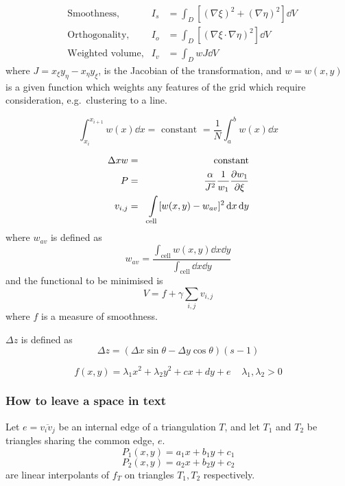 \begin{align}
  &\text{Smoothness,} & 
  I_s &= \int_{D}  [(\nabla \xi)^{2} + (\nabla \eta)^{2} ] \dd V   \\
  &\text{Orthogonality,} &
  I_o &= \int_{D}  [(\nabla \xi \cdot \nabla \eta)^{2} ] \dd V   \\
  &\text{Weighted volume,} &
  I_v &= \int_{D}  wJ \dd V    
\end{align}
where $J = x_{\xi} y_{\eta} - x_{\eta} y_{\xi} $, is the Jacobian of
the transformation, and $w=w(x,y)$ is a given function which weights
any features of the grid which require consideration, e.g.\ clustering
to a line.
 
\begin{equation}
 \int^{x_{i+1}}_{x_i} w(x) \dd x =\text{~constant~} = \frac{1}{N}
 \int^{b}_{a} w(x) \dd x
\end{equation}

\begin{eqnarray}
  \Delta x w &=& \text{~constant} \nonumber \\
  P &=& \frac{\alpha}{J^{2}} \frac{1}{w_{1}} \frac{\partial w_{1}}{\partial \xi} \nonumber \\
  v_{i,j} &=& \int\limits_{\text{cell}} [ w(x,y) - w_{av} ]^2 \,\mathrm{d} x \,\mathrm{d} y
\end{eqnarray}
where $w_{av}$ is defined as
\begin{equation}
  w_{av} = \frac{\int_{\text{cell}} w(x,y) \dd x \dd y }
               {\int_{\text{cell}} \dd x \dd y}
\end{equation}
and the functional to be minimised is
\begin{equation}
  V = f + \gamma \sum_{i,j} v_{i,j}
\end{equation}
where $f$ is a measure of smoothness.

$\Delta z$ is defined as
\begin{equation}
  \Delta z =( \Delta x \sin\theta - \Delta y \cos\theta)(s-1)
\end{equation}

\begin{equation}
 f(x,y) = \lambda_{1} x^{2} + \lambda_{2} y^{2} + cx + dy + e
 \;\;\;\; \lambda_{1}, \lambda_{2} > 0
\end{equation}

\subsubsection{How to leave a space in text}
Let $e = \overline{v_{i}v_{j}}$ be an internal edge of a triangulation
$T$, and let $T_{1}$ and $T_{2}$ be triangles sharing the common edge, $e$.
\vspace{3.5cm} %
\[ P_{1}(x,y) = a_{1} x + b_{1} y + c_{1} \]
$$ P_{2}(x,y) = a_{2} x + b_{2} y + c_{2} $$
are linear interpolants of $f_{T}$ on triangles $T_{1} , T_{2}$
respectively.

